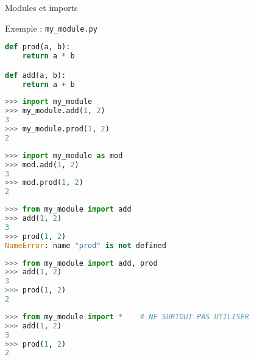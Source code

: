 \begin{frame}[fragile]{Modules et imports}
  \begin{block}{Exemple : \texttt{my\_module.py}} 
    \medskip
\begin{lstlisting}[language=Python, numbers=none]
def prod(a, b):
    return a * b

def add(a, b):
    return a + b
\end{lstlisting}
  \end{block}
  \begin{overprint}


\begin{lstlisting}[language=Python, numbers=none]
>>> import my_module
>>> my_module.add(1, 2)
3
>>> my_module.prod(1, 2)
2
\end{lstlisting}

\begin{lstlisting}[language=Python, morekeywords={as}, numbers=none]
>>> import my_module as mod
>>> mod.add(1, 2)
3
>>> mod.prod(1, 2)
2
\end{lstlisting}


\begin{lstlisting}[language=Python, morekeywords={NameError}, numbers=none]
>>> from my_module import add
>>> add(1, 2)
3
>>> prod(1, 2)
NameError: name "prod" is not defined
\end{lstlisting}

\begin{lstlisting}[language=Python, morekeywords={NameError}, numbers=none]
>>> from my_module import add, prod
>>> add(1, 2)
3
>>> prod(1, 2)
2
\end{lstlisting}

\begin{lstlisting}[language=Python, numbers=none]
>>> from my_module import *    # NE SURTOUT PAS UTILISER
>>> add(1, 2)
3
>>> prod(1, 2)
2
\end{lstlisting}

\end{overprint}

\end{frame}



